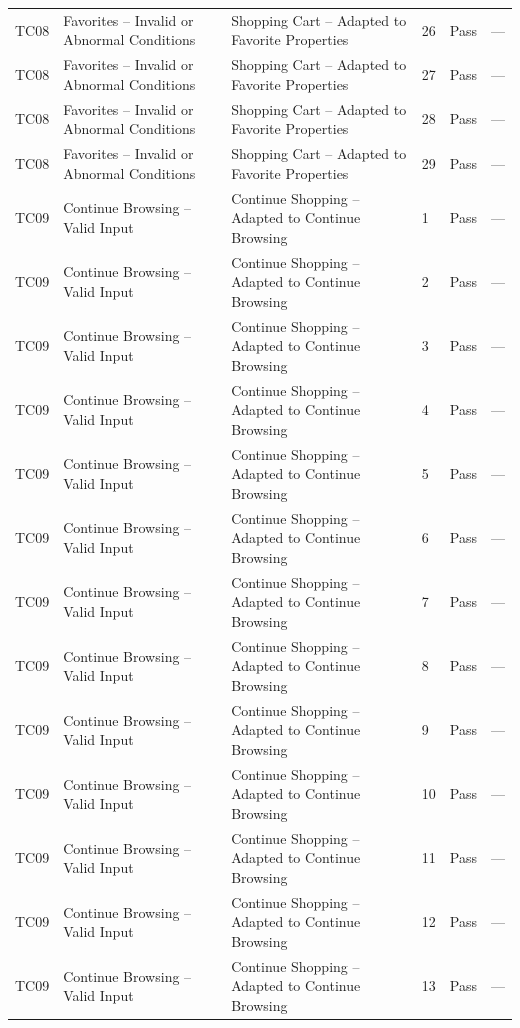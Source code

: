 {\begin{longtable}{@{}p{1.2cm} p{4.2cm} p{4.4cm} p{0.8cm} p{0.9cm} p{1.6cm}@{}}
  TC08 & Favorites -- Invalid or Abnormal Conditions & Shopping Cart -- Adapted to Favorite Properties & 26 & Pass & --- \\
  TC08 & Favorites -- Invalid or Abnormal Conditions & Shopping Cart -- Adapted to Favorite Properties & 27 & Pass & --- \\
  TC08 & Favorites -- Invalid or Abnormal Conditions & Shopping Cart -- Adapted to Favorite Properties & 28 & Pass & --- \\
  TC08 & Favorites -- Invalid or Abnormal Conditions & Shopping Cart -- Adapted to Favorite Properties & 29 & Pass & --- \\
  \midrule
  TC09 & Continue Browsing -- Valid Input & Continue Shopping -- Adapted to Continue Browsing & 1 & Pass & --- \\
  TC09 & Continue Browsing -- Valid Input & Continue Shopping -- Adapted to Continue Browsing & 2 & Pass & --- \\
  TC09 & Continue Browsing -- Valid Input & Continue Shopping -- Adapted to Continue Browsing & 3 & Pass & --- \\
  TC09 & Continue Browsing -- Valid Input & Continue Shopping -- Adapted to Continue Browsing & 4 & Pass & --- \\
  TC09 & Continue Browsing -- Valid Input & Continue Shopping -- Adapted to Continue Browsing & 5 & Pass & --- \\
  TC09 & Continue Browsing -- Valid Input & Continue Shopping -- Adapted to Continue Browsing & 6 & Pass & --- \\
  TC09 & Continue Browsing -- Valid Input & Continue Shopping -- Adapted to Continue Browsing & 7 & Pass & --- \\
  TC09 & Continue Browsing -- Valid Input & Continue Shopping -- Adapted to Continue Browsing & 8 & Pass & --- \\
  TC09 & Continue Browsing -- Valid Input & Continue Shopping -- Adapted to Continue Browsing & 9 & Pass & --- \\
  TC09 & Continue Browsing -- Valid Input & Continue Shopping -- Adapted to Continue Browsing & 10 & Pass & --- \\
  TC09 & Continue Browsing -- Valid Input & Continue Shopping -- Adapted to Continue Browsing & 11 & Pass & --- \\
  TC09 & Continue Browsing -- Valid Input & Continue Shopping -- Adapted to Continue Browsing & 12 & Pass & --- \\
  TC09 & Continue Browsing -- Valid Input & Continue Shopping -- Adapted to Continue Browsing & 13 & Pass & --- \\

\end{longtable}}
